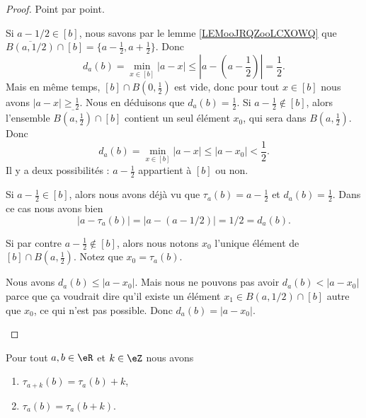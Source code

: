 \begin{proof}
	Point par point.
	\begin{subproof}
		Si \( a-1/2\in[b]\), nous savons par le lemme \ref{LEMooJRQZooLCXOWQ} que \( \overline{B(a,1/2)}\cap [b]=\{ a-\frac{ 1 }{2},a+\frac{ 1 }{2} \}\). Donc
		\begin{equation}
			d_a(b)=\min_{x\in [b]}| a-x |\leq | a-(a-\frac{1  }{2}) |=\frac{ 1 }{2}.
		\end{equation}
		Mais en même temps, \( [b]\cap B(0,\frac{ 1 }{2})\) est vide, donc pour tout \( x\in [b]\) nous avons \( | a-x |\geq \frac{ 1 }{2}\). Nous en déduisons que \( d_a(b)=\frac{ 1 }{2}\).
		Si \( a-\frac{ 1 }{2}\not\in[b]\), alors l'ensemble \( \overline{B(a,\frac{ 1 }{2})}\cap [b]\) contient un seul élément \( x_0\), qui sera dans \( B(a,\frac{ 1 }{2})\). Donc
		\begin{equation}
			d_a(b)=\min_{x\in[b]}| a-x |\leq | a-x_0 |<\frac{ 1 }{2}.
		\end{equation}
		Il y a deux possibilités : \( a-\frac{ 1 }{2}\) appartient à \( [b]\) ou non.

		Si \( a-\frac{ 1 }{2}\in[b]\), alors nous avons déjà vu que \( \tau_a(b)=a-\frac{ 1 }{2}\) et \( d_a(b)=\frac{ 1 }{2}\). Dans ce cas nous avons bien
		\begin{equation}
			| a-\tau_a(b) |=| a-(a-1/2) |=1/2=d_a(b).
		\end{equation}

		Si par contre \( a-\frac{ 1 }{2}\not\in[b]\), alors nous notons \( x_0\) l'unique élément de \( [b]\cap B(a,\frac{ 1 }{2})\). Notez que \( x_0=\tau_a(b)\).

		Nous avons \( d_a(b)\leq | a-x_0 |\). Mais nous ne pouvons pas avoir \( d_a(b)<| a-x_0 |\) parce que ça voudrait dire qu'il existe un élément \( x_1\in B(a,1/2)\cap [b]\) autre que \( x_0\), ce qui n'est pas possible. Donc \( d_a(b)=| a-x_0 |\).
	\end{subproof}
\end{proof}

\begin{lemma}	\label{LEMooAXVLooCmtsPb}
	Pour tout \( a,b\in \eR\) et \( k\in \eZ\) nous avons
	\begin{enumerate}
		\item		\label{ITEMooTELUooJoLYEF}
		      \( \tau_{a+k}(b)=\tau_a(b)+k\),
		\item		\label{ITEMooUWLDooLsDhmI}
		      \( \tau_a(b)=\tau_a(b+k)\).
	\end{enumerate}
\end{lemma}

